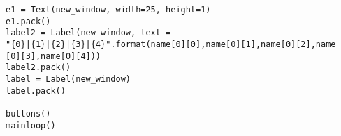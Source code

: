 \documentclass[a4paper]{article}
\begin{document}
\begin{lab1}
\begin{verbatim}
e1 = Text(new_window, width=25, height=1)
e1.pack()
label2 = Label(new_window, text = 
"{0}|{1}|{2}|{3}|{4}".format(name[0][0],name[0][1],name[0][2],name
[0][3],name[0][4]))
label2.pack()
label = Label(new_window)
label.pack()

buttons()
mainloop()

    \end{verbatim}
    \end{lab1}
    
\end{document}
